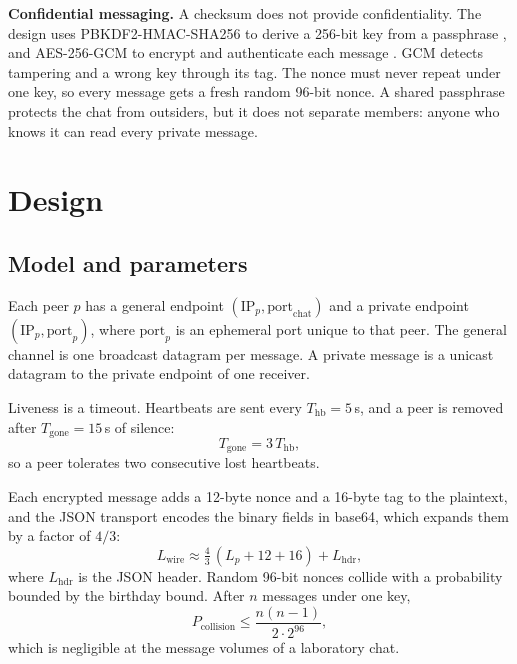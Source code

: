 \documentclass[12pt,a4paper]{article}
\begin{document}
\textbf{Confidential messaging.} A checksum does not provide confidentiality. The
design uses PBKDF2-HMAC-SHA256 to derive a 256-bit key from a passphrase
, and AES-256-GCM to encrypt and authenticate each message
. GCM detects tampering and a wrong key through its tag. The
nonce must never repeat under one key, so every message gets a fresh random
96-bit nonce. A shared passphrase protects the chat from outsiders, but it does
not separate members: anyone who knows it can read every private message.

\section{Design}
\subsection{Model and parameters}
Each peer $p$ has a general endpoint $(\mathrm{IP}_p,\mathrm{port}_{\mathrm{chat}})$
and a private endpoint $(\mathrm{IP}_p,\mathrm{port}_p)$, where $\mathrm{port}_p$ is
an ephemeral port unique to that peer. The general channel is one broadcast
datagram per message. A private message is a unicast datagram to the private
endpoint of one receiver.

Liveness is a timeout. Heartbeats are sent every $T_{\mathrm{hb}}=5$\,s, and a peer
is removed after $T_{\mathrm{gone}}=15$\,s of silence:
\begin{equation}
T_{\mathrm{gone}} = 3\,T_{\mathrm{hb}},
\label{eq:timeout}
\end{equation}
so a peer tolerates two consecutive lost heartbeats.

Each encrypted message adds a 12-byte nonce and a 16-byte tag to the plaintext, and
the JSON transport encodes the binary fields in base64, which expands them by a
factor of $4/3$:
\begin{equation}
L_{\mathrm{wire}} \approx \tfrac{4}{3}\,(L_p + 12 + 16) + L_{\mathrm{hdr}},
\label{eq:overhead}
\end{equation}
where $L_{\mathrm{hdr}}$ is the JSON header. Random 96-bit nonces collide with a
probability bounded by the birthday bound. After $n$ messages under one key,
\begin{equation}
P_{\mathrm{collision}} \le \frac{n(n-1)}{2\cdot 2^{96}},
\label{eq:birthday}
\end{equation}
which is negligible at the message volumes of a laboratory chat.
\end{document}
